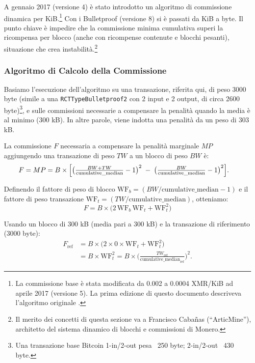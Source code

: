 A gennaio 2017 (versione 4) è stato introdotto un algoritmo di commissione dinamica per KiB\cite{articmine-fee-video, articmine-36c3-dynamics, articmine-defcon27-video, jollymore-old-analysis}.\footnote{La commissione base è stata modificata da 0.002 a 0.0004 XMR/KiB ad aprile 2017 (versione 5)\cite{monero-v5}. La prima edizione di questo documento descriveva l’algoritmo originale \cite{ztm-1}.} Con i Bulletproof (versione 8) si è passati da KiB a byte. Il punto chiave è impedire che la commissione minima cumulativa superi la ricompensa per blocco (anche con ricompense contenute e blocchi pesanti), situazione che crea instabilità\cite{fee-reward-instability, no-reward-instability, selfish-miner}.\footnote{Il merito dei concetti di questa sezione va a Francisco Caba\~nas (“ArticMine”), architetto del sistema dinamico di blocchi e commissioni di Monero.}

\subsubsection*{Algoritmo di Calcolo della Commissione}

Basiamo l'esecuzione dell’algoritmo su una transazione, riferita qui\cite{jollymore-old-analysis}, di peso 3000 byte (simile a una {\tt RCTTypeBulletproof2} con 2 input e 2 output, di circa 2600 byte)\footnote{Una transazione base Bitcoin 1-in/2-out pesa ~250 byte\cite{bitcoin-txsizes-2015}; 2-in/2-out ~430 byte.}, e sulle commissioni necessarie a compensare la penalità quando la media è al minimo (300 kB)\cite{articmine-36c3-dynamics}. In altre parole, viene indotta una penalità da un peso di 303 kB.

La commissione $F$ necessaria a compensare la penalità marginale $MP$ aggiungendo una transazione di peso $TW$ a un blocco di peso $BW$ è:\vspace{.175cm}
\begin{align*}
  F = MP 
    &= B \times \Bigl[\bigl(\tfrac{BW + TW}{\text{cumulative\_median}} - 1\bigr)^2 \;-\; 
        \bigl(\tfrac{BW}{\text{cumulative\_median}} - 1\bigr)^2\Bigr].
\end{align*}

Definendo il fattore di peso di blocco $\mathrm{WF}_b = (BW/\text{cumulative\_median} - 1)$ e il fattore di peso transazione $\mathrm{WF}_t = (TW/\text{cumulative\_median})$, otteniamo:\vspace{.175cm}
\[F = B \times \bigl(2\,\mathrm{WF}_b\,\mathrm{WF}_t + \mathrm{WF}_t^2\bigr)\]

Usando un blocco di 300 kB (media pari a 300 kB) e la transazione di riferimento (3000 byte):\vspace{.175cm}
\begin{align*}
  F_{\text{ref}} 
    &= B \times \bigl(2 \times 0 \times \mathrm{WF}_t + \mathrm{WF}_t^2\bigr)\\
    &= B \times \mathrm{WF}_t^2
    = B \times \bigl(\tfrac{TW_{\text{ref}}}{\text{cumulative\_median}_{\text{ref}}}\bigr)^2.
\end{align*}{}

